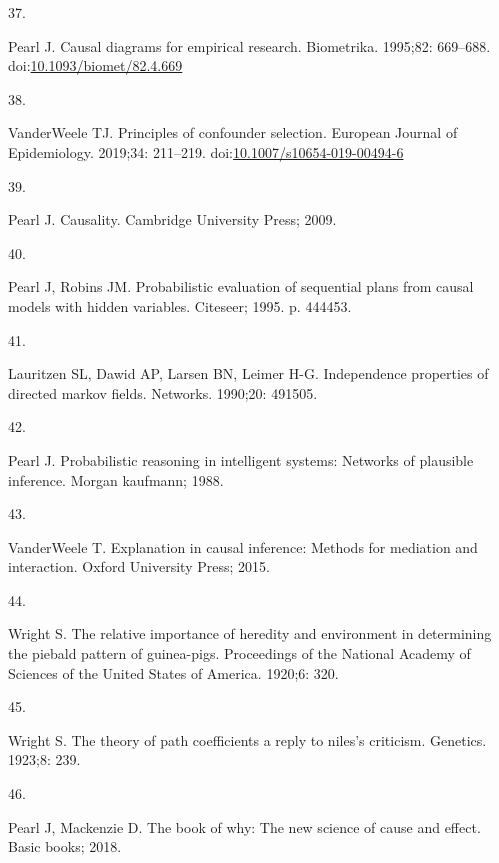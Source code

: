 \documentclass[
  singlecolumn]{article}
\newlength{\cslhangindent}
\newlength{\csllabelwidth}
\newlength{\cslentryspacingunit} %
\newenvironment{CSLReferences}[2] %
 {%
  \setlength{\parindent}{0pt}
  \ifodd #1
  \let\oldpar\par
  \def\par{\hangindent=\cslhangindent\oldpar}
  \fi
  \setlength{\parskip}{#2\cslentryspacingunit}
 }%
 {}
\newcommand{\CSLLeftMargin}[1]{\parbox[t]{\csllabelwidth}{#1}}
\newcommand{\CSLRightInline}[1]{\parbox[t]{\linewidth - \csllabelwidth}{#1}\break}
\begin{document}
\begin{CSLReferences}{0}{0}
\leavevmode{}%
\CSLLeftMargin{37. }%
\CSLRightInline{Pearl J. Causal diagrams for empirical research.
Biometrika. 1995;82: 669--688.
doi:\href{https://doi.org/10.1093/biomet/82.4.669}{10.1093/biomet/82.4.669}}

\leavevmode{}%
\CSLLeftMargin{38. }%
\CSLRightInline{VanderWeele TJ. Principles of confounder selection.
European Journal of Epidemiology. 2019;34: 211--219.
doi:\href{https://doi.org/10.1007/s10654-019-00494-6}{10.1007/s10654-019-00494-6}}

\leavevmode{}%
\CSLLeftMargin{39. }%
\CSLRightInline{Pearl J. Causality. Cambridge University Press; 2009. }

\leavevmode{}%
\CSLLeftMargin{40. }%
\CSLRightInline{Pearl J, Robins JM. Probabilistic evaluation of
sequential plans from causal models with hidden variables. Citeseer;
1995. p. 444453. }

\leavevmode{}%
\CSLLeftMargin{41. }%
\CSLRightInline{Lauritzen SL, Dawid AP, Larsen BN, Leimer H-G.
Independence properties of directed markov fields. Networks. 1990;20:
491505. }

\leavevmode{}%
\CSLLeftMargin{42. }%
\CSLRightInline{Pearl J. Probabilistic reasoning in intelligent systems:
Networks of plausible inference. Morgan kaufmann; 1988. }

\leavevmode{}%
\CSLLeftMargin{43. }%
\CSLRightInline{VanderWeele T. Explanation in causal inference: Methods
for mediation and interaction. Oxford University Press; 2015. }

\leavevmode{}%
\CSLLeftMargin{44. }%
\CSLRightInline{Wright S. The relative importance of heredity and
environment in determining the piebald pattern of guinea-pigs.
Proceedings of the National Academy of Sciences of the United States of
America. 1920;6: 320. }

\leavevmode{}%
\CSLLeftMargin{45. }%
\CSLRightInline{Wright S. The theory of path coefficients a reply to
niles's criticism. Genetics. 1923;8: 239. }

\leavevmode{}%
\CSLLeftMargin{46. }%
\CSLRightInline{Pearl J, Mackenzie D. The book of why: The new science
of cause and effect. Basic books; 2018. }


\end{CSLReferences}
\end{document}
